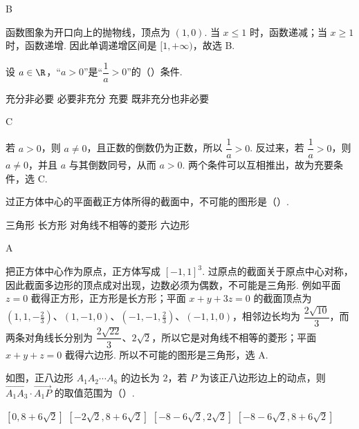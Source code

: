 \begin{answer}
B
\end{answer}

\begin{solution}
函数图象为开口向上的抛物线，顶点为 \((1,0)\). 当 \(x\leq1\) 时，函数递减；当 \(x\geq1\) 时，函数递增. 因此单调递增区间是 \([1,+\infty)\)，故选 B.
\end{solution}

\begin{problem}
设 \(a\in\R\)，“\(a>0\)”是“\(\dfrac1a>0\)”的（\quad）条件.

\choices
    {充分非必要}
    {必要非充分}
    {充要}
    {既非充分也非必要}
\end{problem}

\begin{answer}
C
\end{answer}

\begin{solution}
若 \(a>0\)，则 \(a\neq0\)，且正数的倒数仍为正数，所以 \(\dfrac1a>0\). 反过来，若 \(\dfrac1a>0\)，则 \(a\neq0\)，并且 \(a\) 与其倒数同号，从而 \(a>0\). 两个条件可以互相推出，故为充要条件，选 C.
\end{solution}

\begin{problem}
过正方体中心的平面截正方体所得的截面中，不可能的图形是（\quad）.

\choices
    {三角形}
    {长方形}
    {对角线不相等的菱形}
    {六边形}
\end{problem}

\begin{answer}
A
\end{answer}

\begin{solution}
把正方体中心作为原点，正方体写成 \([-1,1]^3\). 过原点的截面关于原点中心对称，因此截面多边形的顶点成对出现，边数必须为偶数，不可能是三角形. 例如平面 \(z=0\) 截得正方形，正方形是长方形；平面 \(x+y+3z=0\) 的截面顶点为 \((1,1,-\frac23)\)、\((1,-1,0)\)、\((-1,-1,\frac23)\)、\((-1,1,0)\)，相邻边长均为 \(\dfrac{2\sqrt{10}}3\)，而两条对角线长分别为 \(\dfrac{2\sqrt{22}}3\)、\(2\sqrt2\)，所以它是对角线不相等的菱形；平面 \(x+y+z=0\) 截得六边形. 所以不可能的图形是三角形，选 A.
\end{solution}

\begin{problem}
如图，正八边形 \(A_1A_2\cdots A_8\) 的边长为 \(2\)，若 \(P\) 为该正八边形边上的动点，则 \(\overrightarrow{A_1A_3}\cdot \overrightarrow{A_1P}\) 的取值范围为（\quad）.


\choices
    {\([0,8+6\sqrt2]\)}
    {\([-2\sqrt2,8+6\sqrt2]\)}
    {\([-8-6\sqrt2,2\sqrt2]\)}
    {\([-8-6\sqrt2,8+6\sqrt2]\)}
\end{problem}

